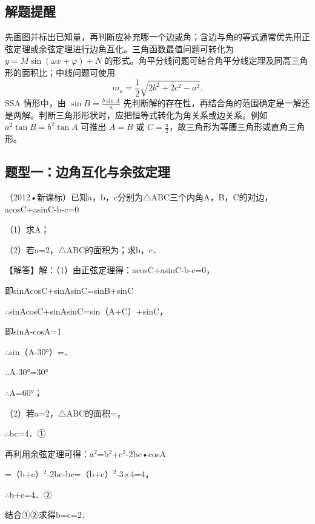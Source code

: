 \subsection{解题提醒}
先画图并标出已知量，再判断应补充哪一个边或角；含边与角的等式通常优先用正弦定理或余弦定理进行边角互化。三角函数最值问题可转化为
$y=M\sin(\omega x+\varphi)+N$ 的形式。角平分线问题可结合角平分线定理及同高三角形的面积比；中线问题可使用
\[
  m_a=\frac12\sqrt{2b^2+2c^2-a^2}.
\]
SSA 情形中，由 $\sin B=\frac{b\sin A}{a}$ 先判断解的存在性，再结合角的范围确定是一解还是两解。判断三角形形状时，应把恒等式转化为角关系或边关系。例如
$a^2\tan B=b^2\tan A$ 可推出 $A=B$ 或 $C=\frac\pi2$，故三角形为等腰三角形或直角三角形。
\subsection{题型一：边角互化与余弦定理}

\begin{question}
（2012•新课标）已知a，b，c分别为$\triangle$ABC三个内角A，B，C的对边，acosC+\allowbreak{}asinC-b-c=0\par
（1）求A；\par
（2）若a=2，$\triangle$ABC的面积为\allowbreak{}；求b，c．\par
\begin{solution}
【解答】解：（1）由正弦定理得：acosC+\allowbreak{}asinC-b-c=0，\par
即sinAcosC+\allowbreak{}sinAsinC=sinB+sinC\par
$\therefore$sinAcosC+\allowbreak{}sinAsinC=sin（A+C）+sinC，\par
即\allowbreak{}sinA-cosA=1\par
$\therefore$sin（A-30°）=\allowbreak{}．\par
$\therefore$A-30°=30°\par
$\therefore$A=60°；\par
（2）若a=2，$\triangle$ABC的面积=\allowbreak{}，\par
$\therefore$bc=4．①\par
再利用余弦定理可得：a$^{2}$=b$^{2}$+c$^{2}$-2bc•cosA\par
=（b+c）$^{2}$-2bc-bc=（b+c）$^{2}$-3×4=4，\par
$\therefore$b+c=4．②\par
结合①②求得b=c=2．\par
\end{solution}
\end{question}

